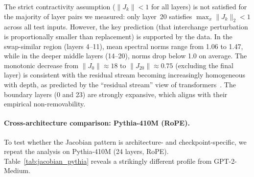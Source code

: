 \documentclass{article}
\begin{document}
The strict contractivity assumption ($\|J_k\| < 1$ for all layers) is not satisfied for the majority of layer pairs we measured: only layer~20 satisfies $\max_x \|J_k\|_2 < 1$ across all test inputs. However, the key prediction (that interchange perturbation is proportionally smaller than replacement) is supported by the data. In the swap-similar region (layers 4--11), mean spectral norms range from 1.06 to 1.47, while in the deeper middle layers (14--20), norms drop below 1.0 on average. The monotonic decrease from $\|J_0\| \approx 18$ to $\|J_{20}\| \approx 0.75$ (excluding the final layer) is consistent with the residual stream becoming increasingly homogeneous with depth, as predicted by the ``residual stream'' view of transformers~\citep{elhage2021mathematical}. The boundary layers (0 and 23) are strongly expansive, which aligns with their empirical non-removability.

\paragraph{Cross-architecture comparison: Pythia-410M (RoPE).}
To test whether the Jacobian pattern is architecture- and checkpoint-specific, we repeat the analysis on Pythia-410M (24 layers, RoPE). Table~\ref{tab:jacobian_pythia} reveals a strikingly different profile from GPT-2-Medium.
\end{document}
